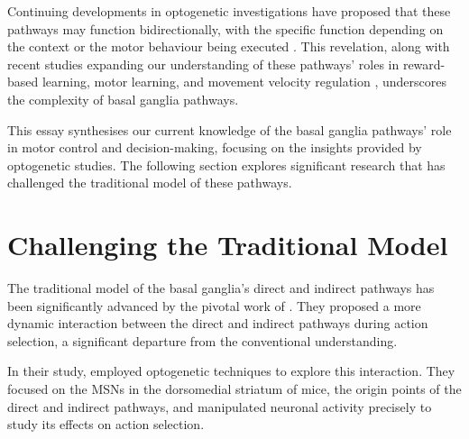 \documentclass[10pt]{article}
\begin{document}
\begin{sloppypar}
  Continuing developments in optogenetic investigations have proposed that these pathways may function bidirectionally, with the specific function depending on the context or the motor behaviour being executed \citep{yttri_opponent_2016}. This revelation, along with recent studies expanding our understanding of these pathways’ roles in reward-based learning, motor learning, and movement velocity regulation \citep{hilt_evidence_2016, wang_direct_2015}, underscores the complexity of basal ganglia pathways.

  This essay synthesises our current knowledge of the basal ganglia pathways’ role in motor control and decision-making, focusing on the insights provided by optogenetic studies. The following section explores significant research that has challenged the traditional model of these pathways.

  \section{Challenging the Traditional Model}
  \label{sec:challenging-the-traditional-model}

  The traditional model of the basal ganglia’s direct and indirect pathways has been significantly advanced by the pivotal work of \cite{cui_concurrent_2013}. They proposed a more dynamic interaction between the direct and indirect pathways during action selection, a significant departure from the conventional understanding.

  In their study, \citeauthor{cui_concurrent_2013} employed optogenetic techniques to explore this interaction. They focused on the MSNs in the dorsomedial striatum of mice, the origin points of the direct and indirect pathways, and manipulated neuronal activity precisely to study its effects on action selection.


\end{sloppypar}
\end{document}
